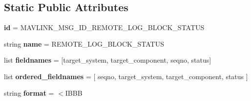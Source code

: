 \subsection*{Static Public Attributes}
\begin{DoxyCompactItemize}
\item 
\mbox{\label{classpymavlink_1_1dialects_1_1v10_1_1MAVLink__remote__log__block__status__message_af7ea0aecfcfbc35f770501e1e3440d3d}} 
{\bfseries id} = M\+A\+V\+L\+I\+N\+K\+\_\+\+M\+S\+G\+\_\+\+I\+D\+\_\+\+R\+E\+M\+O\+T\+E\+\_\+\+L\+O\+G\+\_\+\+B\+L\+O\+C\+K\+\_\+\+S\+T\+A\+T\+US
\item 
\mbox{\label{classpymavlink_1_1dialects_1_1v10_1_1MAVLink__remote__log__block__status__message_a49cb15f832761c74fc795ef383a030c6}} 
string {\bfseries name} = \textquotesingle{}R\+E\+M\+O\+T\+E\+\_\+\+L\+O\+G\+\_\+\+B\+L\+O\+C\+K\+\_\+\+S\+T\+A\+T\+US\textquotesingle{}
\item 
\mbox{\label{classpymavlink_1_1dialects_1_1v10_1_1MAVLink__remote__log__block__status__message_a32a7ba1ef9d3473f49a903b298790b13}} 
list {\bfseries fieldnames} = \mbox{[}\textquotesingle{}target\+\_\+system\textquotesingle{}, \textquotesingle{}target\+\_\+component\textquotesingle{}, \textquotesingle{}seqno\textquotesingle{}, \textquotesingle{}status\textquotesingle{}\mbox{]}
\item 
\mbox{\label{classpymavlink_1_1dialects_1_1v10_1_1MAVLink__remote__log__block__status__message_a017756215d3d852cb07e69cd773b04b1}} 
list {\bfseries ordered\+\_\+fieldnames} = \mbox{[} \textquotesingle{}seqno\textquotesingle{}, \textquotesingle{}target\+\_\+system\textquotesingle{}, \textquotesingle{}target\+\_\+component\textquotesingle{}, \textquotesingle{}status\textquotesingle{} \mbox{]}
\item 
\mbox{\label{classpymavlink_1_1dialects_1_1v10_1_1MAVLink__remote__log__block__status__message_ab8a0ac1f4c6f1d58d5229dfd78e54029}} 
string {\bfseries format} = \textquotesingle{}$<$I\+B\+BB\textquotesingle{}

\end{DoxyCompactItemize}
